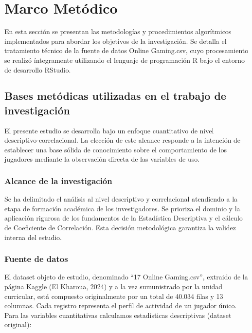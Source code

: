 \documentclass[oneside,11pt]{Latex/Classes/PhDthesisPSnPDF}
\begin{document}
\chapter{Marco Metódico}

En esta sección se presentan las metodologías y procedimientos
algorítmicos implementados para abordar los objetivos de la
investigación. Se detalla el tratamiento técnico de la fuente de datos
Online Gaming.csv, cuyo procesamiento se realizó íntegramente utilizando
el lenguaje de programación R bajo el entorno de desarrollo RStudio.

\section{Bases metódicas utilizadas en el trabajo de investigación}

El presente estudio se desarrolla bajo un enfoque cuantitativo de nivel
descriptivo-correlacional. La elección de este alcance responde a la
intención de establecer una base sólida de conocimiento sobre el
comportamiento de los jugadores mediante la observación directa de las
variables de uso.

\subsection{Alcance de la investigación}

Se ha delimitado el análisis al nivel descriptivo y correlacional
atendiendo a la etapa de formación académica de los investigadores. Se
prioriza el dominio y la aplicación rigurosa de los fundamentos de la
Estadística Descriptiva y el cálculo de Coeficiente de Correlación. Esta
decisión metodológica garantiza la validez interna del estudio.

\subsection{Fuente de datos}

El dataset objeto de estudio, denominado ``17 Online Gaming.csv'',
extraido de la página Kaggle (El Kharoua, 2024) y a la vez sumunistrado
por la unidad curricular, está compuesto originalmente por un total de
40.034 filas y 13 columnas. Cada registro representa el perfil de
actividad de un jugador único. Para las variables cuantitativas
calculamos estadisticas descriptivas (dataset original):
\end{document}
